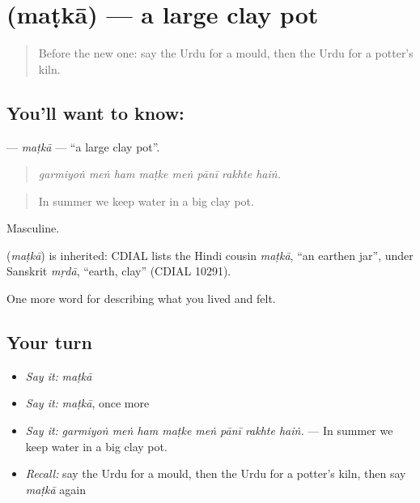 \section[\texorpdfstring{\ur{مٹکا} (maṭkā)}{مٹکا (maṭkā)}]{ (maṭkā) — a large clay pot}

\label{lesson:UR-C498-matka}



\begin{quote}
Before the new one: say the Urdu for a mould, then the Urdu for a potter's kiln.
\end{quote}

\subsection*{You'll want to know: }
\textbf{} — \emph{maṭkā} — \textquotedblleft{}a large clay pot\textquotedblright{}.

\begin{quote}
       
\end{quote}

\begin{quote}
\emph{garmiyoṅ meṅ ham maṭke meṅ pānī rakhte haiṅ.}
\end{quote}

\begin{quote}
In summer we keep water in a big clay pot.
\end{quote}

Masculine.

\begin{cousinweb}
\textbf{} (\emph{maṭkā}) is inherited: CDIAL lists the Hindi cousin \emph{maṭkā}, \textquotedblleft{}an earthen jar\textquotedblright{}, under Sanskrit \emph{mṛdā}, \textquotedblleft{}earth, clay\textquotedblright{} (CDIAL 10291).
\end{cousinweb}

\begin{grammarlens}[title={What you've built}]
One more word for describing what you lived and felt.
\end{grammarlens}

\subsection*{Your turn}
\begin{itemize}
\raggedright
  \item \emph{Say it:} \emph{maṭkā}
  \item \emph{Say it:} \emph{maṭkā}, once more
  \item \emph{Say it:} \emph{garmiyoṅ meṅ ham maṭke meṅ pānī rakhte haiṅ.} — In summer we keep water in a big clay pot.
  \item \emph{Recall:} say the Urdu for a mould, then the Urdu for a potter's kiln, then say \emph{maṭkā} again
\end{itemize}

